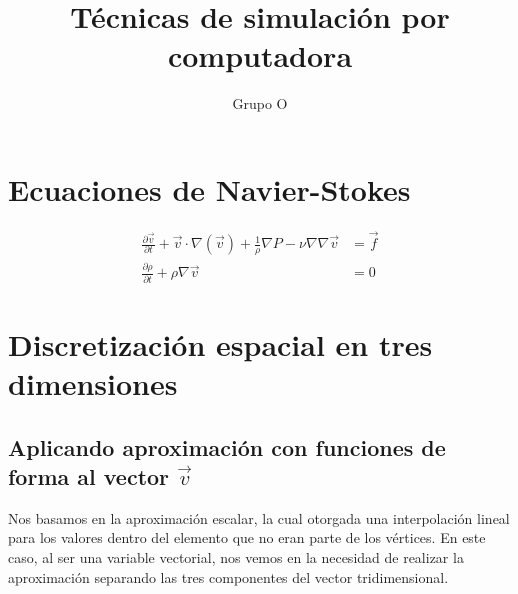 \documentclass[12pt]{article}
\title{T\'ecnicas de simulaci\'on por computadora}
\author{Grupo O}
\def\diffp[#1]#2{\frac{\partial#1}{\partial#2}}
\newcommand{\vv}{\vec{v}}
\newcommand{\vf}{\vec{f}}
\begin{document}
\maketitle
\vspace{3cm}
\section{Ecuaciones de Navier-Stokes}
\begin{align*}
	\diffp[\vv]{t} + \vv \cdot \nabla (\vv) + \frac{1}{\rho} \nabla P - \nu \nabla \nabla \vv &= \vf \\
	\diffp[\rho]{t} + \rho \nabla \vv &= 0
\end{align*}

\section{Discretizaci\'on espacial en tres dimensiones}

\subsection{Aplicando aproximaci\'on con funciones de forma al vector $\vv$}
Nos basamos en la aproximaci\'on escalar, la cual otorgada una interpolaci\'on lineal
para los valores dentro del elemento que no eran parte de los v\'ertices. En este caso, al ser una
variable vectorial, nos vemos en la necesidad de realizar la aproximaci\'on separando las tres componentes
del vector tridimensional.
\end{document}
